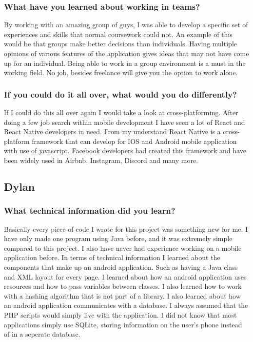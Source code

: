\documentclass[onecolumn, draftclsnofoot,10pt, compsoc]{IEEEtran}
\begin{document}
    \subsubsection{What have you learned about working in teams?}
      By working with an amazing group of guys, I was able to develop a specific set of experiences and skills that normal coursework could not. An example of this would be that groups make better decisions than individuals. Having multiple opinions of various features of the application gives ideas that may not have come up for an individual. Being able to work in a group environment is a must in the working field. No job, besides freelance will give you the option to work alone.

    \subsubsection{\textbf{If you could do it all over, what would you do differently?}}
      If I could do this all over again I would take a look at cross-platforming. After doing a few job search within mobile development I have seen a lot of React and React Native developers in need. From my understand React Native is a cross-platform framework that can develop for IOS and Android mobile application with use of javascript. Facebook developers had created this framework and have been widely used in Airbnb, Instagram, Discord and many more.

  \subsection{Dylan}
    \subsubsection{What technical information did you learn?}
      Basically every piece of code I wrote for this project was something new for me. I have only made one program using Java before, and it was extremely simple compared to this project. I also have never had experience working on a mobile application before. In terms of technical information I learned about the components that make up an android application. Such as having a Java class and XML layout for every page. I learned about how an android application uses resources and how to pass variables between classes. I also learned how to work with a hashing algorithm that is not part of a library. I also learned about how an android application communicates with a database. I always assumed that the PHP scripts would simply live with the application. I did not know that most applications simply use SQLite, storing information on the user’s phone instead of in a seperate database.
\end{document}
